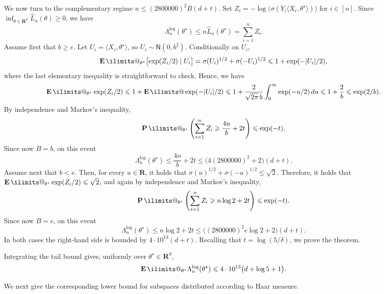\documentclass[11pt, letterpaper, hidelinks]{article}
\makeatletter
\renewcommand{\proofname}{\textit{\textbf{Proof}}}
\renewenvironment{proof}[1][\proofname]{\par\pushQED{\qed}\normalfont \topsep6\p@\@plus6\p@\relax\trivlist\item[\hskip\labelsep#1\@addpunct{}]\ignorespaces}{\popQED\endtrivlist\@endpefalse}
\newcommand{\R}{\mathbf R}
\newcommand{\1}{\mathbf 1}
\renewcommand{\le}{\leqslant}
\renewcommand{\leq}{\leqslant}
\renewcommand{\geq}{\geqslant}
\newcommand{\E}{\operatorname*{\mathbf{E}}\ilimits@}
\renewcommand{\P}{\operatorname*{\mathbf{P}}\ilimits@}
\theoremstyle{plain}
\theoremstyle{definition}
\newcommand{\thetastar}{\theta^\star}
\newcommand{\Normal}[2]{\mathsf{N}\left(#1, #2\right)}
\newcommand{\defn}{=}
\makeatother
\begin{document}
\begin{proof}
We now turn to the complementary regime
$n \leq (2800000)^2 B(d+t)$. Set 
$
Z_i =
-\log\bigl(\sigma(Y_i\langle X_i,\thetastar\rangle)\bigr)
$ for $i \in [n]$.
Since $\inf_{\theta \in \R^d}\widehat L_n(\theta) \geq 0$, we have
\[
\Lambda_n^{\operatorname{log}}(\thetastar)
\le
n\widehat L_n(\thetastar)
=
\sum_{i=1}^n Z_i.
\]
Assume first that $b \geq e$. Let $U_i \defn \langle X_i,\thetastar\rangle$, so
$U_i \sim \Normal{0}{b^2}$. Conditionally on $U_i$,
\[
\E_{\thetastar}\bigl[\exp(Z_i/2)\mid U_i\bigr]
=
\sigma(U_i)^{1/2}+\sigma(-U_i)^{1/2}
\le
1+\exp(-|U_i|/2),
\]
where the last elementary inequality is straightforward to check. 
Hence, we have
\[
\E_{\thetastar}\exp(Z_i/2)
\le
1+\E \exp(-|U_i|/2)
\le
1+\frac{2}{\sqrt{2\pi}\,b}\int_0^\infty \exp(-u/2)\,du
\le
1+\frac{2}{b}
\le
\exp(2/b).
\]
By independence and Markov's inequality,
\[
\P_{\thetastar}\left(
\sum_{i=1}^n Z_i \geq \frac{4n}{b}+2t
\right)
\le
\exp(-t).
\]
Since now $B=b$, on this event
\[
\Lambda_n^{\operatorname{log}}(\thetastar)
\le
\frac{4n}{b}+2t
\le
\bigl(4(2800000)^2+2\bigr)(d+t).
\]
Assume next that $b<e$. Then, for every $u \in \R$,
 it holds that $
\sigma(u)^{1/2}+\sigma(-u)^{1/2}
\le
\sqrt 2.
$
Therefore, it holds that $\E_{\thetastar}\exp(Z_i/2) \leq \sqrt 2$, and again by independence and
Markov's inequality,
\[
\P_{\thetastar}\left(
\sum_{i=1}^n Z_i \geq n\log 2 + 2t
\right)
\le
\exp(-t).
\]
Since now $B=e$, on this event
\[
\Lambda_n^{\operatorname{log}}(\thetastar)
\le
n\log 2 + 2t
\le
\bigl((2800000)^2 e\log 2 + 2\bigr)(d+t).
\]
In both cases the right-hand side is bounded by
$4\cdot 10^{13}(d+t)$. Recalling that $t=\log(5/\delta)$, we prove the theorem.
\end{proof}

Integrating the tail bound gives, uniformly over $\thetastar\in\R^d$,
\[
\E_{\thetastar}\Lambda_n^{\operatorname{log}}(\thetastar)
\leq 4\cdot10^{13}\bigl(d+\log 5+1\bigr).
\]

We next give the corresponding lower bound for subspaces distributed according to Haar measure.
\end{document}
